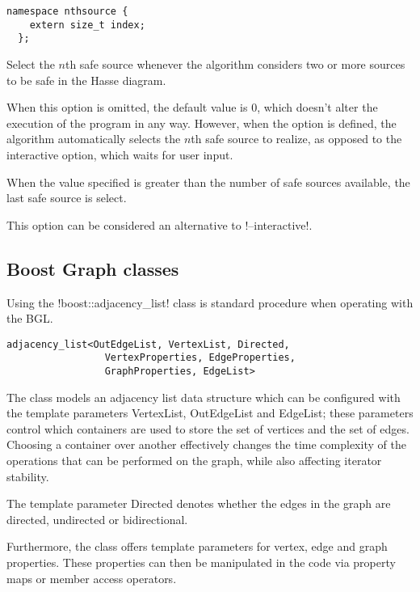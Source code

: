 \begin{lstlisting}[style=c++_block, aboveskip=\smallskipamount]
  namespace nthsource {
    extern size_t index;
  };
\end{lstlisting}

Select the $n$th safe source whenever the algorithm considers two or more sources to be safe in the Hasse diagram.

When this option is omitted, the default value is 0, which doesn't alter the execution of the program in any way.
However, when the option is defined, the algorithm automatically selects the $n$th safe source to realize, as opposed to the interactive option, which waits for user input.

When the value specified is greater than the number of safe sources available, the last safe source is select.

This option can be considered an alternative to !--interactive!.

\subsection{Boost Graph classes}\label{section:graph-classes}

\lstset{style=c++_block}

Using the !boost::adjacency_list! class is standard procedure when operating with the BGL.

\begin{lstlisting}[style=code_block, basicstyle=\footnotesize\ttfamily\bfseries\color{block_fg}]
  adjacency_list<OutEdgeList, VertexList, Directed,
                 VertexProperties, EdgeProperties,
                 GraphProperties, EdgeList>
\end{lstlisting}

The class models an adjacency list data structure which can be configured with the template parameters VertexList, OutEdgeList and EdgeList; these parameters control which containers are used to store the set of vertices and the set of edges.
Choosing a container over another effectively changes the time complexity of the operations that can be performed on the graph, while also affecting iterator stability.

The template parameter Directed denotes whether the edges in the graph are directed, undirected or bidirectional.

Furthermore, the class offers template parameters for vertex, edge and graph properties. These properties can then be manipulated in the code via property maps or member access operators.


